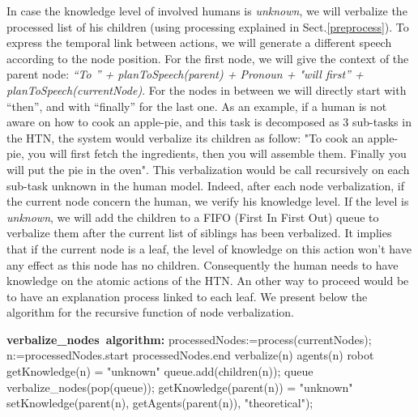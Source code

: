 \documentclass{llncs}
\begin{document}
In case the knowledge level of involved humans is \textit{unknown}, we will verbalize the processed list of his children (using processing explained in Sect.\ref{preprocess}).
To express the temporal link between actions, we will generate a different speech according to the node position.
For the first node, we will give the context of the parent node: \textit{``To '' + planToSpeech(parent) + Pronoun +  "will first'' + planToSpeech(currentNode)}. For the nodes in between we will directly start with ``then'', and with ``finally'' for the last one.
As an example, if a human is not aware on how to cook an apple-pie, and this task is decomposed as 3 sub-tasks in the HTN, the system would verbalize its children as follow:
"To cook an apple-pie, you will first fetch the ingredients, then you will  assemble them. Finally you will put the pie in the oven".
This verbalization would be call recursively on each sub-task unknown in the human model.
%
Indeed, after each node verbalization, if the current node concern the human, we verify his knowledge level. If the level is \textit{unknown}, we will add the children
to a FIFO (First In First Out) queue to verbalize them after the current list of siblings has been verbalized.
It implies that if the current node is a leaf, the level of knowledge on this action won't have any effect as this node has no children. Consequently the human needs to have knowledge on the atomic actions of the HTN. An other way to proceed would be to have an explanation process linked to each leaf.
We present below the algorithm for the recursive function of node verbalization.
\begin{program} 
\mbox{\textbf{verbalize\_nodes algorithm:}}
processedNodes:=process(currentNodes);
\FOR n:=processedNodes.start \TO processedNodes.end  \DO
     verbalize(n)
     \IF agents(n) \neq robot \AND getKnowledge(n) = "unknown"
        \THEN queue.add(children(n)); \FI \OD
\WHILE queue \neq \emptyset \DO 
      verbalize\_nodes(pop(queue)); \OD
\IF getKnowledge(parent(n)) = "unknown"
	\THEN setKnowledge(parent(n), getAgents(parent(n)), "theoretical"); \FI
        
\end{program}
\end{document}
